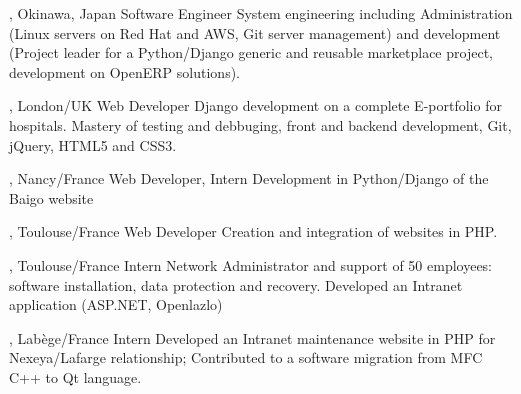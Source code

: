 \documentclass[english]{ecv}
\begin{document}
\begin{ecv}
                 {, Okinawa, Japan}
                {Software Engineer}
        {System engineering including Administration (Linux servers on
          Red Hat and AWS, Git server management) and development
          (Project leader for a Python/Django generic and reusable
          marketplace project, development on OpenERP solutions).}


                 {, London/UK}
                 {Web Developer}
                 {Django development on a complete E-portfolio for hospitals.
                   Mastery of testing and debbuging, front and backend
                   development, Git, jQuery, HTML5 and CSS3.
                 }

                 {, Nancy/France}
                 {Web Developer, Intern}
                 {Development in Python/Django of the Baigo website
                 }

                 {, Toulouse/France}
                 {Web Developer}
                 {Creation and integration of websites in PHP.
                 }

                 {, Toulouse/France}
                 {Intern
                 }
                 {Network Administrator and support of 50 employees: software
                   installation, data protection and recovery. Developed an
                   Intranet application (ASP.NET, Openlazlo)
                 }

                 {, Lab\`ege/France}
                 {Intern
                 }
                 {Developed an Intranet maintenance website in PHP for Nexeya/Lafarge
                  relationship; Contributed to a software migration from MFC C++
                  to Qt language.
                 }


\end{ecv}
\end{document}
